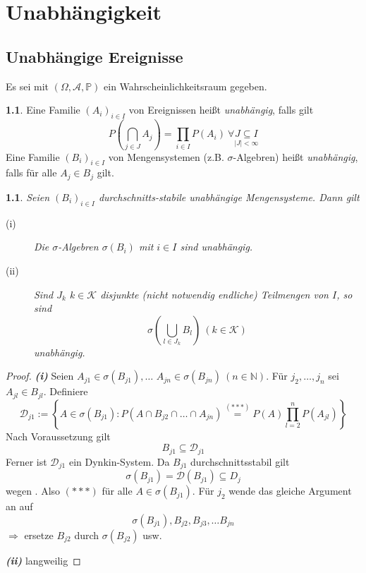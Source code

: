 \documentclass[10pt,a4paper]{report}
\numberwithin{equation}{section}
\numberwithin{figure}{section}
\theoremstyle{plain}
\theoremstyle{definition}
\newtheorem{defn}[thm]{\protect\definitionname}
\theoremstyle{remark}
\theoremstyle{plain}
\newtheorem{prop}[thm]{\protect\propositionname}
\providecommand{\definitionname}{Definition}
\providecommand{\propositionname}{Satz}
\newcommand{\1}{ \mathbb{1} } %
\begin{document}
\chapter{Unabhängigkeit}


\section{Unabhängige Ereignisse}
Es sei mit $\left(\Omega,\mathcal{A},\mathbb{P}\right)$ ein Wahrscheinlichkeitsraum
gegeben.
\begin{defn} 
Eine Familie $\left(A_{i}\right)_{i\in I}$ von Ereignissen heißt
\emph{unabhängig}, falls gilt
\begin{equation}
P\left(\bigcap_{j\in J}A_{j}\right)=\prod_{i\in I}P\left(A_{i}\right)\ \forall\underset{\left|J\right|<\infty}{J\subseteq I}\label{eq:def1.1}
\end{equation}
 Eine Familie $\left(B_{i}\right)_{i\in I}$ von Mengensystemen (z.B.
$\sigma$-Algebren) heißt \emph{unabhängig}, falls für
alle $A_{j}\in B_{j}$ gilt.
\end{defn}
\begin{prop}
Seien $\left(B_{i}\right)_{i\in I}$ durchschnitts-stabile unabhängige
Mengensysteme. Dann gilt
\begin{description}
\item [{(i)}] Die $\sigma$-Algebren $\sigma\left(B_{i}\right)$ mit $i\in I$
sind unabhängig.
\item [{(ii)}] Sind $J_{k}$ $k\in\mathcal{K}$ disjunkte (nicht notwendig
endliche) Teilmengen von $I$, so sind
\[
\sigma\left(\bigcup_{l\in J_{k}}B_{l}\right)\ \left(k\in\mathcal{K}\right)
\]
unabhängig. \label{s1.2(ii)}
\end{description}
\end{prop}
\begin{proof}
\textbf{\emph{(i)}} Seien $A_{j1}\in\sigma\left(B_{j1}\right),\ldots$
$A_{jn}\in\sigma\left(B_{jn}\right)\ \left(n\in\mathbb{N}\right)$.
Für $j_{2},\ldots,j_{n}$ sei $A_{jl}\in B_{jl}$. Definiere
\begin{equation}
\mathcal{D}_{j1}:=\left\{ A\in\sigma\left(B_{j1}\right):P\left(A\cap B_{j2}\cap\ldots\cap A_{jn}\right)\overset{(***)}{=}P\left(A\right)\prod_{l=2}^{n}P\left(A_{jl}\right)\right\} \label{eq:b1.2**-1}
\end{equation}
Nach Voraussetzung gilt
\begin{equation}
B_{j1}\subseteq\mathcal{D}_{j1}\label{eq:b1.2**}
\end{equation}
Ferner ist $\mathcal{D}_{j1}$ ein Dynkin-System. Da $B_{j1}$ durchschnittsstabil
gilt
\[
\sigma\left(B_{j1}\right)=\mathcal{D}\left(B_{j1}\right)\subseteq D_{j}
\]
wegen . Also $(***)$ für alle $A\in\sigma\left(B_{j1}\right)$.
Für $j_{2}$ wende das gleiche Argument an auf
\[
\sigma\left(B_{j1}\right),B_{j2},B_{j3},\ldots B_{jn}
\]
$\Rightarrow$ ersetze $B_{j2}$ durch $\sigma\left(B_{j2}\right)$
usw.

\textbf{\emph{(ii)}} langweilig
\end{proof}
\end{document}

